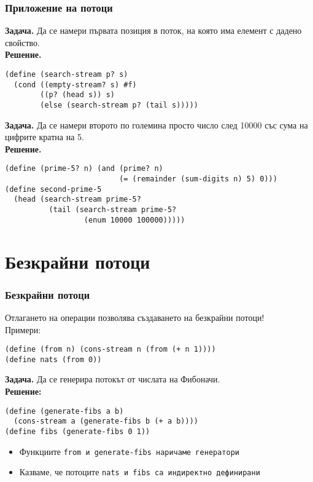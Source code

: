 \documentclass[alsotrans]{beamerswitch}
\begin{document}
\begin{frame}[fragile]
  \frametitle{Приложение на потоци}

  \small
  \textbf{Задача.} Да се намери първата позиция в поток, на която има елемент с дадено свойство.\\
  \pause
  \textbf{Решение.}
\begin{lstlisting}
(define (search-stream p? s)
  (cond ((empty-stream? s) #f)
        ((p? (head s)) s)
        (else (search-stream p? (tail s)))))
\end{lstlisting}
  \pause
  \textbf{Задача.} Да се намери второто по големина просто число след 10000 със сума на цифрите кратна на 5.\\
  \pause
  \textbf{Решение.}
\begin{lstlisting}
(define (prime-5? n) (and (prime? n)
                          (= (remainder (sum-digits n) 5) 0)))
(define second-prime-5
  (head (search-stream prime-5?
          (tail (search-stream prime-5?
                  (enum 10000 100000)))))
\end{lstlisting}
\end{frame}

\section{Безкрайни потоци}

\begin{frame}[fragile]
  \frametitle{Безкрайни потоци}

  Отлагането на операции позволява създаването на \alert{безкрайни потоци}!\\[1em]
  \pause
  Примери:
\begin{lstlisting}
(define (from n) (cons-stream n (from (+ n 1))))
(define nats (from 0))
\end{lstlisting}
  \pause
  \textbf{Задача.} Да се генерира потокът от числата на Фибоначи.\\
  \pause
  \textbf{Решение:}
\begin{lstlisting}
(define (generate-fibs a b)
  (cons-stream a (generate-fibs b (+ a b))))
(define fibs (generate-fibs 0 1))
\end{lstlisting}
  \pause
  \begin{itemize}
  \item Функциите \tt{from} и \tt{generate-fibs} наричаме \alert{генератори}
  \item Казваме, че потоците \tt{nats} и \tt{fibs} са \alert{индиректно дефинирани}
  \end{itemize}
\end{frame}
\end{document}
